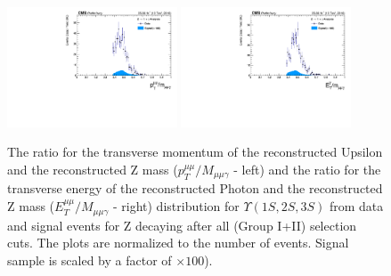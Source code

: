 \begin{figure}[!htbp]
\begin{center}
\includegraphics[width=0.45\textwidth]{figures_and_tables/outputPlots/ZtoUpsilon_Cat0_ZZZZZ/nEvts/data_x_mc/withKinCuts/h_withKin_upsilonPt_over_zMass}\hspace*{1.cm}
\includegraphics[width=0.45\textwidth]{figures_and_tables/outputPlots/ZtoUpsilon_Cat0_ZZZZZ/nEvts/data_x_mc/withKinCuts/h_withKin_photonPt_over_zMass}
\end{center}\vspace*{-.5cm}
\caption{The ratio for the transverse momentum of the reconstructed Upsilon and the reconstructed Z mass ($p_{T}^{\mu\mu}/M_{\mu\mu\gamma}$ - left) and the ratio for the transverse energy of the reconstructed Photon and the reconstructed Z mass ($E_{T}^{\mu\mu}/M_{\mu\mu\gamma}$ - right) distribution for $\Upsilon(1S,2S,3S)$ from data and signal events for Z decaying after all (Group I+II) selection cuts. The plots are normalized to the number of events. Signal sample is scaled by a factor of $\times 100$).}
\label{fig:energy_ration_ZtoUpsilon_Cat0_groupI_plus_II}
\end{figure}


